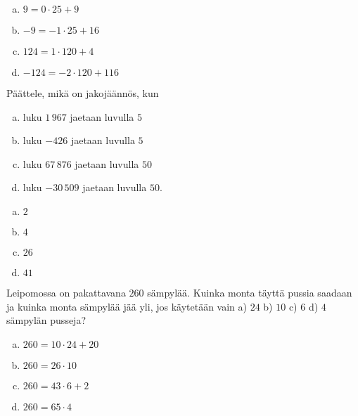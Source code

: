 \begin{tehtavasivu}
\begin{tehtava}
    \begin{vastaus}
        \begin{enumerate}[a)]
        \item $9 = 0\cdot 25 + 9$
        \item $-9 = -1\cdot 25 + 16$
        \item $124 = 1\cdot 120 + 4$
        \item $-124 = -2\cdot 120 + 116$
        \end{enumerate}
    \end{vastaus}
\end{tehtava}

\begin{tehtava}
    Päättele, mikä on jakojäännös, kun
    \begin{enumerate}[a)]
    \item luku $1\,967$ jaetaan luvulla $5$
    \item luku $-426$ jaetaan luvulla $5$
    \item luku $67\,876$ jaetaan luvulla $50$
    \item luku $-30\,509$ jaetaan luvulla $50$.
    \end{enumerate}
    
    \begin{vastaus}
        \begin{enumerate}[a)]
        \item $2$
        \item $4$
        \item $26$
        \item $41$
        \end{enumerate}
    \end{vastaus}
\end{tehtava}

\begin{tehtava}
    Leipomossa on pakattavana $260$ sämpylää. Kuinka monta täyttä pussia saadaan ja kuinka monta sämpylää jää yli, jos käytetään vain a) $24$ b) $10$ c) $6$ d) $4$ sämpylän pusseja?
    \begin{vastaus}
        \begin{enumerate}[a)]
        \item $260 = 10\cdot 24 + 20$
        \item $260 = 26\cdot 10$
        \item $260 = 43\cdot 6 + 2$
        \item $260 = 65\cdot 4$
        \end{enumerate}     
    \end{vastaus}


\end{tehtava}
\end{tehtavasivu}
